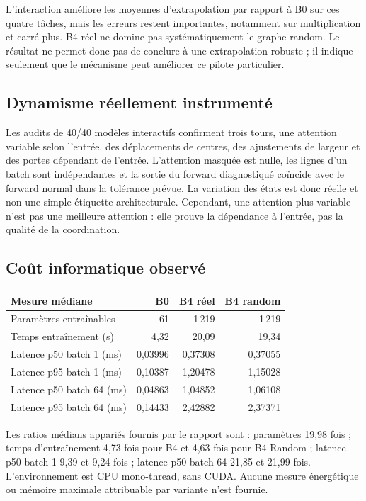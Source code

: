 \documentclass[11pt,a4paper]{article}
\begin{document}
L'interaction améliore les moyennes d'extrapolation par rapport à B0 sur ces quatre tâches, mais les erreurs restent importantes, notamment sur multiplication et carré-plus. B4 réel ne domine pas systématiquement le graphe random. Le résultat ne permet donc pas de conclure à une extrapolation robuste ; il indique seulement que le mécanisme peut améliorer ce pilote particulier.

\subsection{Dynamisme réellement instrumenté}

Les audits de 40/40 modèles interactifs confirment trois tours, une attention variable selon l'entrée, des déplacements de centres, des ajustements de largeur et des portes dépendant de l'entrée. L'attention masquée est nulle, les lignes d'un batch sont indépendantes et la sortie du forward diagnostiqué coïncide avec le forward normal dans la tolérance prévue. La variation des états est donc réelle et non une simple étiquette architecturale. Cependant, une attention plus variable n'est pas une meilleure attention : elle prouve la dépendance à l'entrée, pas la qualité de la coordination.

\subsection{Coût informatique observé}

\begin{center}
\small
\begin{tabular}{lrrr}
\toprule
Mesure médiane & B0 & B4 réel & B4 random\\
\midrule
Paramètres entraînables & 61 & 1\,219 & 1\,219\\
Temps entraînement (s) & 4,32 & 20,09 & 19,34\\
Latence p50 batch 1 (ms) & 0,03996 & 0,37308 & 0,37055\\
Latence p95 batch 1 (ms) & 0,10387 & 1,20478 & 1,15028\\
Latence p50 batch 64 (ms) & 0,04863 & 1,04852 & 1,06108\\
Latence p95 batch 64 (ms) & 0,14433 & 2,42882 & 2,37371\\
\bottomrule
\end{tabular}
\end{center}

Les ratios médians appariés fournis par le rapport sont : paramètres 19,98 fois ; temps d'entraînement 4,73 fois pour B4 et 4,63 fois pour B4-Random ; latence p50 batch 1 9,39 et 9,24 fois ; latence p50 batch 64 21,85 et 21,99 fois. L'environnement est CPU mono-thread, sans CUDA. Aucune mesure énergétique ou mémoire maximale attribuable par variante n'est fournie.
\end{document}
